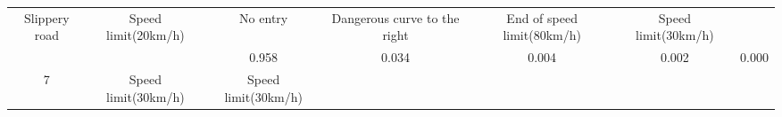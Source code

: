 \documentclass[11pt]{article}
\begin{document}
\begin{longtable}[]{@{}ccccccc@{}}
\begin{minipage}[t]{0.04\columnwidth}
Slippery road\strut
\end{minipage} & \begin{minipage}[t]{0.04\columnwidth}\centering\strut
Speed limit(20km/h)\strut
\end{minipage} & \begin{minipage}[t]{0.04\columnwidth}\centering\strut
No entry\strut
\end{minipage} & \begin{minipage}[t]{0.04\columnwidth}\centering\strut
Dangerous curve to the right\strut
\end{minipage} & \begin{minipage}[t]{0.04\columnwidth}\centering\strut
End of speed limit(80km/h)\strut
\end{minipage} & \begin{minipage}[t]{0.04\columnwidth}\centering\strut
Speed limit(30km/h)\strut
\end{minipage}\tabularnewline
\begin{minipage}[t]{0.04\columnwidth}\centering\strut
\strut
\end{minipage} & \begin{minipage}[t]{0.04\columnwidth}\centering\strut
\strut
\end{minipage} & \begin{minipage}[t]{0.04\columnwidth}\centering\strut
0.958\strut
\end{minipage} & \begin{minipage}[t]{0.04\columnwidth}\centering\strut
0.034\strut
\end{minipage} & \begin{minipage}[t]{0.04\columnwidth}\centering\strut
0.004\strut
\end{minipage} & \begin{minipage}[t]{0.04\columnwidth}\centering\strut
0.002\strut
\end{minipage} & \begin{minipage}[t]{0.04\columnwidth}\centering\strut
0.000\strut
\end{minipage}\tabularnewline
\begin{minipage}[t]{0.04\columnwidth}\centering\strut
7\strut
\end{minipage} & \begin{minipage}[t]{0.04\columnwidth}\centering\strut
Speed limit(30km/h)\strut
\end{minipage} & \begin{minipage}[t]{0.04\columnwidth}\centering\strut
Speed limit(30km/h)\strut
\end{minipage} & \begin{minipage}[t]{0.04\columnwidth}\centering\strut

\end{minipage}
\end{longtable}
\end{document}

